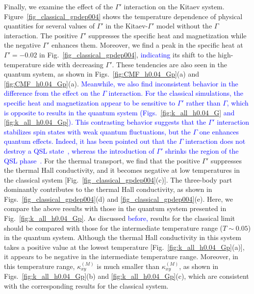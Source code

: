 \documentclass[reprint,amsmath,amssymb,aps,prx]{revtex4-2}
\newcommand{\blue}[1]{\textcolor{blue}{#1}}
\begin{document}
Finally, we examine the effect of the $\Gamma'$ interaction on the Kitaev system.
Figure~\ref{fig_classical_gpdep004} shows the temperature dependence of physical quantities for several values of $\Gamma'$ in the Kitaev-$\Gamma'$ model without the $\Gamma$ interaction.
The positive $\Gamma'$ suppresses the specific heat and magnetization while the negative $\Gamma'$ enhances them.
Moreover, we find a peak in the specific heat at $\Gamma'=-0.02$ in Fig.~\ref{fig_classical_gpdep004}, \blue{indicating} its shift to the high-temperature side with decreasing $\Gamma'$.
These tendencies are also seen in the quantum system, as shown in Figs.~\ref{fig:CMF_h0.04_Gp}(a) and \ref{fig:CMF_h0.04_Gp}(a).
\blue{Meanwhile, we also find inconsistent behavior in the difference from the effect on the $\Gamma$ interaction.
For the classical simulations, the specific heat and magnetization appear to be sensitive to $\Gamma'$ rather than $\Gamma$, which is opposite to results in the quantum system (Figs.~\ref{fig:k_all_h0.04_G} and \ref{fig:k_all_h0.04_Gp}).
This contrasting behavior suggests that the $\Gamma'$ interaction stabilizes spin states with weak quantum fluctuations, but the $\Gamma$ one enhances quantum effects.
Indeed, it has been pointed out that the $\Gamma$ interaction does not destroy a QSL state~\cite{Gohlke2018,catuneanu2018}, whereas the introduction of $\Gamma'$ shrinks the region of the QSL phase~\cite{gordon2019theory,Luo2022}.
}
For the thermal transport, we find that the positive $\Gamma'$ suppresses the thermal Hall conductivity, and it becomes negative at low temperatures in the classical system [Fig.~\ref{fig_classical_gpdep004}(c)].
The three-body part dominantly contributes to the thermal Hall conductivity, as shown in Figs.~\ref{fig_classical_gpdep004}(d) and \ref{fig_classical_gpdep004}(e).
Here, we compare the above results with those in the quantum system presented in Fig.~\ref{fig:k_all_h0.04_Gp}.
As discussed \blue{before,} %
results for the classical limit should be compared with those for the intermediate temperature range ($T\sim 0.05$) in the quantum system.
Although the thermal Hall conductivity in this system takes a positive value at the lowest temperature [Fig.~\ref{fig:k_all_h0.04_Gp}(a)], it appears to be negative in the intermediate temperature range.
Moreover, in this temperature range, $\kappa_{xy}^{(M)}$ is much smaller than $\kappa_{xy}^{(M)}$, as shown in Figs.~\ref{fig:k_all_h0.04_Gp}(b) and \ref{fig:k_all_h0.04_Gp}(c), which are consistent with the corresponding results for the classical system.
\end{document}
